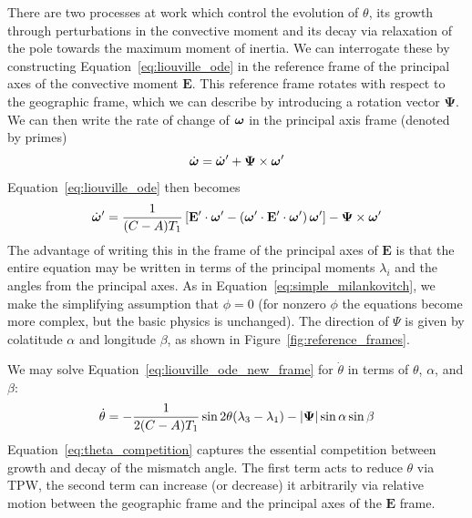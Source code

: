 \documentclass[extra,mreferee]{gji}
\begin{document}
There are two processes at work which control the evolution of $\theta$, its growth through perturbations in the convective moment and 
its decay via relaxation of the pole towards the maximum moment of inertia.
We can interrogate these by constructing Equation~\eqref{eq:liouville_ode} in the reference frame
of the principal axes of the convective moment $\mathbf{E}$.
This reference frame rotates with respect to the geographic frame, which we can
describe by introducing a rotation vector $\mathbf{\Psi}$.
We can then write the rate of change of $\mitbf{\omega}$ in the principal axis frame (denoted by primes)
\begin{equation}
\dot{\mitbf{\omega}} = \dot{\mitbf{\omega}}^\prime + \mathbf{\Psi}\times \mitbf{\omega}^\prime
\end{equation}
Equation~\eqref{eq:liouville_ode} then becomes
\begin{equation}
 \dot{\mitbf{\omega}}^\prime  = \frac{1}{(C-A)T_1} \left[ \mathbf{E}^\prime \cdot \mitbf{\omega}^\prime - \left( \mitbf{\omega}^\prime \cdot \mathbf{E}^\prime \cdot \mitbf{\omega}^\prime  \right) \mitbf{\omega}^\prime \right] - \mathbf{\Psi}\times \mitbf{\omega}^\prime
\label{eq:liouville_ode_new_frame}
\end{equation}
The advantage of writing this in the frame of the principal axes of $\mathbf{E}$ is that the entire equation
may be written in terms of the principal moments $\lambda_i$ and the angles from the principal axes.
As in Equation~\eqref{eq:simple_milankovitch}, we make the simplifying assumption that $\phi=0$
(for nonzero $\phi$ the equations become more complex, but the basic physics is unchanged).
The direction of $\Psi$ is given by colatitude $\alpha$ and longitude $\beta$, as shown in Figure~\ref{fig:reference_frames}.

We may solve Equation~\eqref{eq:liouville_ode_new_frame} for $\dot{\theta}$ in terms of $\theta$, $\alpha$, and $\beta$:
\begin{equation}
\dot{\theta} = 
-\frac{1}{2(C-A) T_1}\sin{2\theta} ( \lambda_3 - \lambda_1) - \vert \mitbf{\Psi} \vert \sin\alpha \sin\beta
\label{eq:theta_competition}
\end{equation}
Equation~\eqref{eq:theta_competition} captures the essential competition between growth and decay of the mismatch angle.
The first term acts to reduce $\theta$ via TPW, the second term can increase (or decrease) it arbitrarily via
relative motion between the geographic frame and the principal axes of the $\mathbf{E}$ frame.
\end{document}
